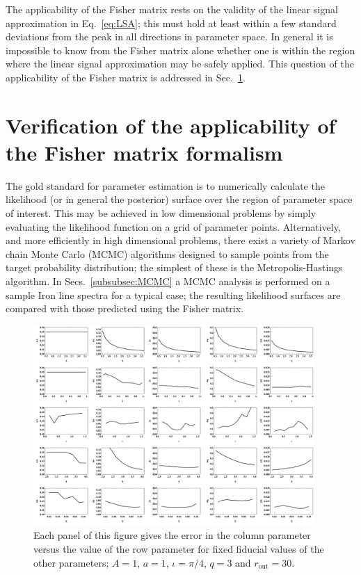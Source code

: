 The applicability of the Fisher matrix rests on the validity of the linear signal approximation in Eq.\ \ref{eq:LSA}; this must hold at least within a few standard deviations from the peak in all directions in parameter space. In general it is impossible to know from the Fisher matrix alone whether one is within the region where the linear signal approximation may be safely applied. This question of the applicability of the Fisher matrix is addressed in Sec.\ \ref{subsec:validityFish}.

\section{Verification of the applicability of the Fisher matrix formalism}\label{subsec:validityFish}
The gold standard for parameter estimation is to numerically calculate the likelihood (or in general the posterior) surface over the region of parameter space of interest. This may be achieved in low dimensional problems by simply evaluating the likelihood function on a grid of parameter points. Alternatively, and more efficiently in high dimensional problems, there exist a variety of Markov chain Monte Carlo (MCMC) algorithms designed to sample points from the target probability distribution; the simplest of these is the Metropolis-Hastings algorithm. In Secs.\ \ref{subsubsec:MCMC} a MCMC analysis is performed on a sample Iron line spectra for a typical case; the resulting likelihood surfaces are compared with those predicted using the Fisher matrix.

\begin{figure}[t]
 \centering
 \includegraphics[trim=0cm 0cm 0cm 0cm, width=0.95\textwidth]{KerrFisherMatrixErrors2.pdf}
 \caption{Each panel of this figure gives the error in the column parameter versus the value of the row parameter for fixed fiducial values of the other parameters; $A=1$, $a=1$, $\iota=\pi/4$, $q=3$ and $r_{\textrm{out}}=30$.}
 \label{fig:KerrFisherMatrixErrors}
\end{figure}

